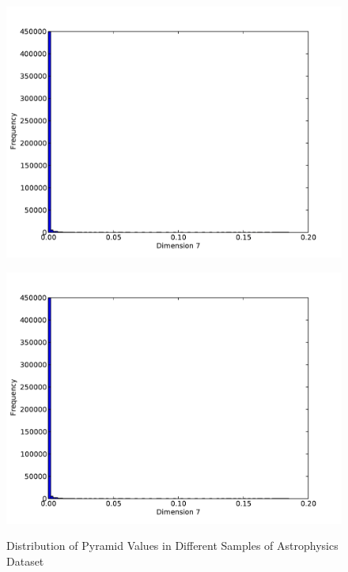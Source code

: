\begin{figure}
\begin{center}
		\begin{subfloat}{%
			\includegraphics[scale=0.25]{figures/histograms/astrophysics_500000_6.pdf}
		}
		\end{subfloat}
		\begin{subfloat}{%
			\includegraphics[scale=0.25]{figures/histograms/astrophysics_500000_6.pdf}
		}
		\end{subfloat}
	\end{center}

	\caption{Distribution of Pyramid Values in Different Samples of Astrophysics Dataset}
	\label{fig:astrophysics-pyval-histograms}
\end{figure}



